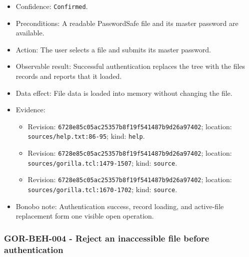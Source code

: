 \documentclass[
  letterpaper,
]{article}
\newcommand{\passthrough}[1]{#1}
\providecommand{\tightlist}{%
  \setlength{\itemsep}{0pt}\setlength{\parskip}{0pt}}
\begin{document}
\begin{itemize}
\tightlist
\item
  Confidence: \passthrough{\lstinline!Confirmed!}.
\item
  Preconditions: A readable PasswordSafe file and its master password are available.
\item
  Action: The user selects a file and submits its master password.
\item
  Observable result: Successful authentication replaces the tree with the file\textquotesingle s records and reports
  that it loaded.
\item
  Data effect: File data is loaded into memory without changing the file.
\item
  Evidence:

  \begin{itemize}
  \tightlist
  \item
    Revision: \nolinkurl{6728e85c05ac25357b8f19f541487b9d26a97402}; location: \nolinkurl{sources/help.txt:86-95}; kind:
    \passthrough{\lstinline!help!}.
  \item
    Revision: \nolinkurl{6728e85c05ac25357b8f19f541487b9d26a97402}; location: \nolinkurl{sources/gorilla.tcl:1479-1507};
    kind: \passthrough{\lstinline!source!}.
  \item
    Revision: \nolinkurl{6728e85c05ac25357b8f19f541487b9d26a97402}; location: \nolinkurl{sources/gorilla.tcl:1670-1702};
    kind: \passthrough{\lstinline!source!}.
  \end{itemize}
\item
  Bonobo note: Authentication success, record loading, and active-file replacement form one visible open operation.
\end{itemize}

\subsubsection{GOR-BEH-004 - Reject an inaccessible file before
authentication}\label{gor-beh-004---reject-an-inaccessible-file-before-authentication}
\end{document}
